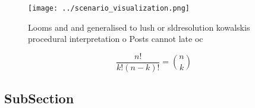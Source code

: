 \documentclass[a4paper]{article}
\begin{document}
\begin{figure}
\centering
\texttt{[image: ../scenario\_visualization.png]}
\caption{Looms and and generalised to lush or sldresolution kowalskis procedural interpretation o Posts cannot late oc
}
\end{figure}
 
\[ \frac{n!}{k!(n-k)!} = \binom{n}{k} \]

\subsection{SubSection}
\end{document}
